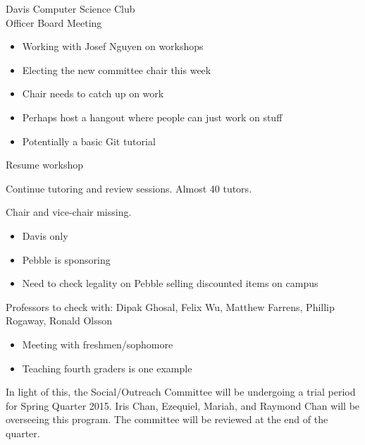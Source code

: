 \documentclass{article}
\begin{document}
\begin{Minutes}{Davis Computer Science Club\\Officer Board Meeting}


\begin{itemize}
	\item Working with Josef Nguyen on workshops
	\item Electing the new committee chair this week
\end{itemize}


\begin{itemize}
	\item Chair needs to catch up on work
	\item Perhaps host a hangout where people can just work on stuff
	\item Potentially a basic Git tutorial
\end{itemize}


Resume workshop


Continue tutoring and review sessions. Almost 40 tutors.


Chair and vice-chair missing.



\begin{itemize}
	\item Davis only
	\item Pebble is sponsoring
	\item Need to check legality on Pebble selling discounted items on campus
\end{itemize}


Professors to check with: Dipak Ghosal, Felix Wu, Matthew Farrens, Phillip Rogaway, Ronald Olsson


\begin{itemize}
	\item Meeting with freshmen/sophomore
	\item Teaching fourth graders is one example
\end{itemize}

In light of this, the Social/Outreach Committee will be undergoing a trial period for Spring Quarter 2015. Iris Chan, Ezequiel, Mariah, and Raymond Chan will be overseeing this program. The committee will be reviewed at the end of the quarter.


\end{Minutes}
\end{document}
